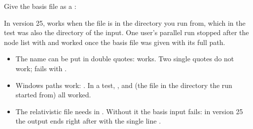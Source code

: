 \documentclass[letterpaper,10pt,english,openany,oneside]{sphinxmanual}
\begin{document}
\sphinxAtStartPar
Give the basis file as a :

\begin{sphinxVerbatim}[commandchars=\\\{\}]
\end{sphinxVerbatim}

\sphinxAtStartPar
In version 25,  works when the file is in the directory you run from, which in the test was also
the directory of the input. One user’s parallel run stopped after
the node list with  and worked once the basis file was
given with its full path.


\begin{itemize}
\item {} 
\sphinxAtStartPar
The name can be put in double quotes:  works. Two single quotes do not work; 
fails with .



\item {} 
\sphinxAtStartPar
Windows paths work: . In a test, ,
 and  (the file in the directory the run started from) all worked.



\item {} 
\sphinxAtStartPar
The relativistic file  needs  in . Without it the basis input fails: in version 25
the output ends right after  with the single line .



\end{itemize}
\end{document}
